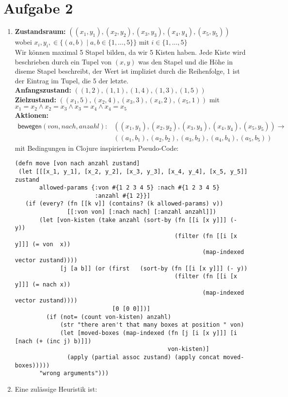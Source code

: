 \documentclass[a4paper,10pt]{article}
\begin{document}
\section*{Aufgabe 2}
\begin{enumerate}[~~a)]
    \item 
    \textbf{Zustandsraum:} 
    $((x_1, y_1), (x_2, y_2), (x_3, y_3), (x_4, y_4), (x_5, y_5))$ wobei $ x_i, y_i, \in \{ (a, b) \mid a, b \in \{1,\dots,5\}\} \text{ mit }i \in \{1,\dots,5\}$ \\
    Wir können maximal 5 Stapel bilden, da wir 5 Kisten haben. Jede Kiste wird beschrieben durch ein Tupel von $(x,y)$ was den Stapel und die Höhe in diseme Stapel beschreibt, der Wert ist impliziet durch die Reihenfolge, 1 ist der Eintrag im Tupel, die 5 der letzte. \\
    \textbf{Anfangszustand:}
    $((1,2),(1,1),(1,4),(1,3),(1,5))$ \\
    \textbf{Zielzustand:}
    $((x_1,5),(x_2,4),(x_3,3),(x_4,2),(x_5,1))$ mit $x_1 = x_2 \land x_2 = x_3 \land x_3 = x_4 \land x_4 = x_5$\\
    \textbf{Aktionen:}
    \begin{align*}\textsf{bewegen}(von, nach, anzahl): &((x_1, y_1), (x_2, y_2), (x_3, y_3), (x_4, y_4), (x_5, y_5)) \rightarrow   \\ &((a_1, b_1), (a_2, b_2), (a_3, b_3), (a_4, b_4), (a_5, b_5))\end{align*}
    mit Bedingungen in Clojure inspiriertem Pseudo-Code:
\begin{lstlisting}
(defn move [von nach anzahl zustand]
 (let [[[x_1, y_1], [x_2, y_2], [x_3, y_3], [x_4, y_4], [x_5, y_5]] zustand
       allowed-params {:von #{1 2 3 4 5} :nach #{1 2 3 4 5}
                       :anzahl #{1 2}}]
   (if (every? (fn [[k v]] (contains? (k allowed-params) v))
               [[:von von] [:nach nach] [:anzahl anzahl]])
       (let [von-kisten (take anzahl (sort-by (fn [[i [x y]]] (- y))
                                              (filter (fn [[i [x y]]] (= von  x))
                                                      (map-indexed vector zustand))))
             [j [a b]] (or (first   (sort-by (fn [[i [x y]]] (- y)) 
                                              (filter (fn [[i [x y]]] (= nach x))
                                                      (map-indexed vector zustand))))
                            [0 [0 0]])]
         (if (not= (count von-kisten) anzahl)
             (str "there aren't that many boxes at position " von)
             (let [moved-boxes (map-indexed (fn [j [i [x y]]] [i [nach (+ (inc j) b)]]) 
                                            von-kisten)]
               (apply (partial assoc zustand) (apply concat moved-boxes)))))
       "wrong arguments")))

\end{lstlisting}
    \item Eine zulässige Heuristik ist: \\
\end{enumerate}
\end{document}

